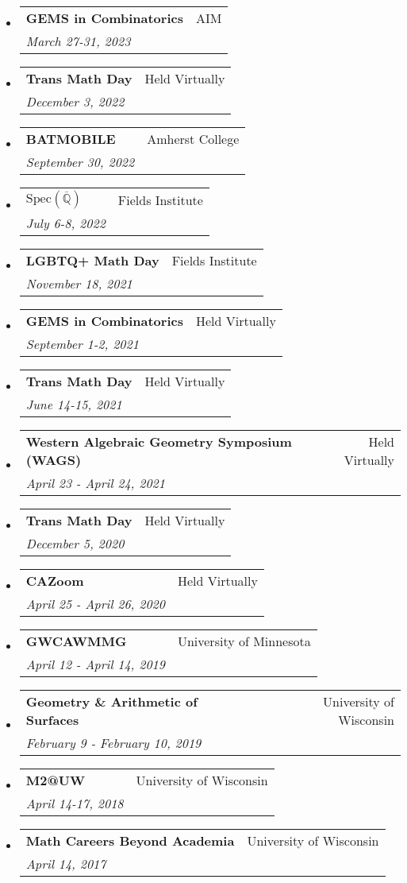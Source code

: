 \documentclass[letterpaper,11pt]{article}
\makeatletter
\newcommand{\ressubheading}[4]{
\begin{tabular*}{6.5in}[t]{l@{\cftdotfill{\cftsecdotsep}\extracolsep{\fill}}r}
		\textbf{#1} & #2 \\
		\textit{#3} & \textit{#4} \\
\end{tabular*}\vspace{-6pt}}
\makeatother
\begin{document}
\begin{itemize}

\item 
\ressubheading{GEMS in Combinatorics}{AIM}{March 27-31, 2023}{} 

\item 
\ressubheading{Trans Math Day }{Held Virtually}{December 3, 2022}{} 


\item
\ressubheading{BATMOBILE}{Amherst College}{September 30, 2022}{} 

\item 
\ressubheading{$\text{Spec}(\overline{\mathbb{Q}})$}{Fields Institute}{July 6-8, 2022}{} 

\item 
\ressubheading{LGBTQ+ Math Day}{Fields Institute}{November 18, 2021}{} 

\item 
\ressubheading{GEMS in Combinatorics}{Held Virtually}{September 1-2, 2021}{} 

\item 
\ressubheading{Trans Math Day }{Held Virtually}{June 14-15, 2021}{} 


\item
\ressubheading{Western Algebraic Geometry Symposium (WAGS)}{Held Virtually}{April 23 - April 24, 2021}{} 

\item 
\ressubheading{Trans Math Day }{Held Virtually}{December 5, 2020}{} 


\item 
\ressubheading{CAZoom}{Held Virtually}{April 25 - April 26, 2020}{} 

%

\item 
\ressubheading{GWCAWMMG}{University of Minnesota}{April 12 - April 14, 2019}{} 

\item 
\ressubheading{Geometry \& Arithmetic of Surfaces}{University of Wisconsin}{February 9 - February 10, 2019}{} 

\item 
\ressubheading{M2@UW}{University of Wisconsin}{April 14-17, 2018}{} 

\item 
\ressubheading{Math Careers Beyond Academia}{University of Wisconsin}{April 14, 2017}{} 

\end{itemize}
\end{document}
